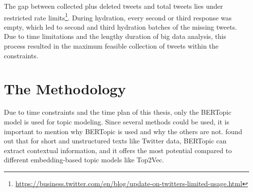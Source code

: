 The gap between collected plus deleted tweets and total tweets lies under restricted 
rate limits\footnote{\url{https://business.twitter.com/en/blog/update-on-twitters-limited-usage.html}}. 
During hydration, every second or third response was empty, which led to second 
and third hydration batches of the missing tweets. Due to time limitations 
and the lengthy duration of big data analysis, this process resulted in the 
maximum feasible collection of tweets within the constraints.

\section{The Methodology}

Due to time constraints and the time plan of this thesis, only the BERTopic model 
is used for topic modeling. Since several methods could be used, it is important 
to mention why BERTopic is used and why the others are not.
\textcite{topic_model_comparison_bertopic_2022} found out that for short and 
unstructured texts like Twitter data, BERTopic can extract contextual information, 
and it offers the most potential compared to different embedding-based topic models like Top2Vec.

